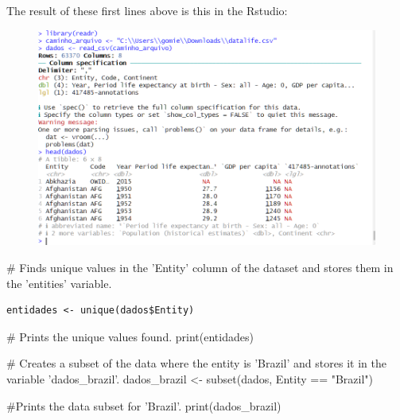 \documentclass{article}
\begin{document}
The result of these first lines above is this in the Rstudio:
\begin{figure}[H]
    \centering
    \includegraphics[width=1\linewidth]{imagesfolder/image11.png}
\end{figure}


\begin{spverbatim}
# Finds unique values in the 'Entity' column of the dataset and stores them in the 'entities' variable.
\end{spverbatim}
\begin{verbatim}
entidades <- unique(dados$Entity)
\end{verbatim}
\begin{spverbatim}
# Prints the unique values found.
print(entidades) 

# Creates a subset of the data where the entity is 'Brazil' and stores it in the variable 'dados_brazil'.
dados_brazil <- subset(dados, Entity == "Brazil")

#Prints the data subset for 'Brazil'.
print(dados_brazil)
\end{spverbatim}
\end{document}
